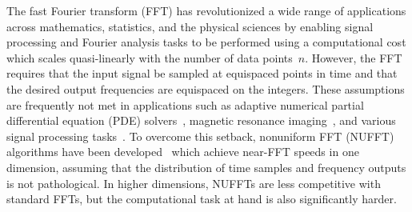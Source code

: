 
The fast Fourier transform (FFT) has revolutionized a wide range of applications
across mathematics, statistics, and the physical sciences by enabling signal
processing and Fourier analysis tasks to be performed using a computational cost
which scales quasi-linearly with the number of data points~$n$. However, the FFT
requires that the input signal be sampled at equispaced points in time and that
the desired output frequencies are equispaced on the integers. These assumptions
are frequently not met in applications such as adaptive numerical partial
differential equation (PDE)
solvers~\cite{alpert2002adaptive,jiang2023dual,askham2017adaptive,nochetto2009theory},
magnetic resonance
imaging~\cite{greengard2007fast,bondesson2019nonuniform,bronstein2002reconstruction},
and various signal processing
tasks~\cite{alexander2012adaptive,thakur2011synchrosqueezing}. To overcome this
setback, nonuniform FFT (NUFFT) algorithms have been
developed~\cite{dutt1993fast,greengard2004accelerating} which achieve near-FFT
speeds in one dimension, assuming that the distribution of time samples and
frequency outputs is not pathological. In higher dimensions, NUFFTs are less
competitive with standard FFTs, but the computational task at hand is also
significantly harder.

